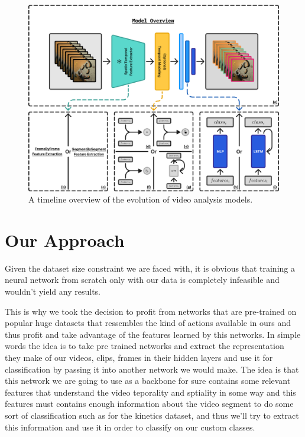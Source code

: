 \begin{figure}[t]
    \centering
    \includegraphics[width=\textwidth]{../../assets/figures/model-overview.png}
    \caption{A timeline overview of the evolution of video analysis models.}
    \label{fig:your-label}
\end{figure}

\section{Our Approach}

Given the dataset size constraint we are faced with, it is obvious that training a neural network from scratch only with our data is completely infeasible and wouldn't yield any results.

This is why we took the decision to profit from networks that are pre-trained on popular huge datasets that ressembles the kind of actions available in ours and thus profit and take advantage of the features learned by this networks. In simple words the idea is to take pre trained networks and extract the representation they make of our videos, clips, frames in their hidden layers and use it for classification by passing it into another network we would make.
The idea is that this network we are going to use as a backbone for sure contains some relevant features that understand the video teporality and sptiality in some way and this features must contains enough information about the video segment to do some sort of classification such as for the kinetics dataset, and thus we'll try to extract this information and use it in order to classify on our custom classes. 

